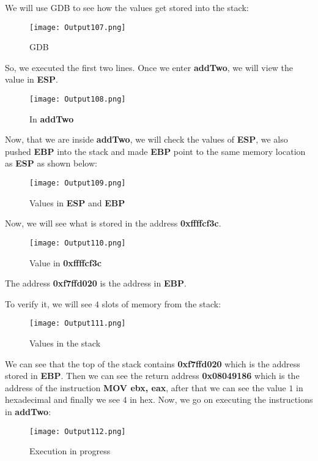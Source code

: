 \documentclass{article}
\makeatletter
\renewcommand\paragraph{\@startsection{paragraph}{4}{\z@}{-3.25ex \@plus -1ex \@minus -.2ex}{1.5ex \@plus .2ex}{\normalfont\normalsize\bfseries}}
\makeatother
\begin{document}
\paragraph{}
We will use GDB to see how the values get stored into the stack:
\begin{figure}[h]
	\centering
	\texttt{[image: Output107.png]}
	\caption{GDB}
	\label{fig:fig5}
\end{figure}

So, we executed the first two lines.
\newpage
Once we enter \textbf{addTwo}, we will view the value in \textbf{ESP}.
\begin{figure}[h]
	\centering
	\texttt{[image: Output108.png]}
	\caption{In \textbf{addTwo}}
	\label{fig:fig6}
\end{figure}

Now, that we are inside \textbf{addTwo}, we will check the values of \textbf{ESP}, we also pushed \textbf{EBP} into the stack and made \textbf{EBP} point to the same memory location as \textbf{ESP} as shown below:
\begin{figure}[h]
	\centering
	\texttt{[image: Output109.png]}
	\caption{Values in \textbf{ESP} and \textbf{EBP}}
	\label{fig:fig7}
\end{figure}
\newpage
Now, we will see what is stored in the address \textbf{0xffffcf3c}.
\begin{figure}[h]
	\centering
	\texttt{[image: Output110.png]}
	\caption{Value in \textbf{0xffffcf3c}}
	\label{fig:fig8}
\end{figure}

The address \textbf{0xf7ffd020} is the address in \textbf{EBP}.

To verify it, we will see $4$ slots of memory from the stack:
\begin{figure}[h]
	\centering
	\texttt{[image: Output111.png]}
	\caption{Values in the stack}
	\label{fig:fig9}
\end{figure}

We can see that the top of the stack contains \textbf{0xf7ffd020} which is the address stored in \textbf{EBP}. Then we can see the return address \textbf{0x08049186} which is the address of the instruction \textbf{MOV ebx, eax}, after that we can see the value $1$ in hexadecimal and finally we see $4$ in hex.
\newpage
Now, we go on executing the instructions in \textbf{addTwo}:
\begin{figure}[h]
	\centering
	\texttt{[image: Output112.png]}
	\caption{Execution in progress}
	\label{fig:fig10}
\end{figure}
\end{document}

